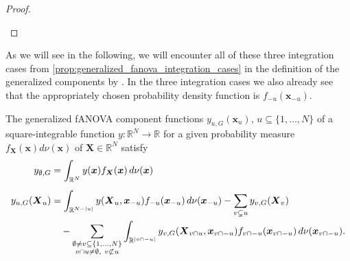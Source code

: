 \begin{proof}
\begin{center}
\end{center}
\end{proof}
As we will see in the following, we will encounter all of these three integration cases from \autoref{prop:generalized_fanova_integration_cases} in the definition of the generalized components by \cite{rahman2014}.
In the three integration cases we also already see that the appropriately chosen probability density function is $f_{-u}(\boldsymbol{x}_{-u})$.
\newpage
\begin{proposition}\label{prop:generalized_fanova_components_rahman}
The generalized fANOVA component functions \( y_{u,G}(\boldsymbol{x}_u)\), \(u \subseteq \{1,\dots,N\}\) of a square-integrable function $y:\mathbb{R}^N \to \mathbb{R}$ for a given probability measure $f_{\boldsymbol{X}}(\boldsymbol{x}) d\nu(\boldsymbol{x})$ of $\boldsymbol{X} \in \mathbb{R}^N$ satisfy
\begin{align}
y_{\emptyset,G} &= \int_{\mathbb{R}^N} y(\boldsymbol{x}) f_{\boldsymbol{X}}(\boldsymbol{x}) \, d \nu(\boldsymbol{x}) \\[0.5em]
y_{u,G}(\boldsymbol{X}_u) &= \int_{\mathbb{R}^{N - |u|}} y(\boldsymbol{X}_u, \boldsymbol{x}_{-u}) f_{-u}(\boldsymbol{x}_{-u}) \, d \nu(\boldsymbol{x}_{-u})
- \sum_{v \subsetneq u} y_{v,G}(\boldsymbol{X}_v) \notag \\
&\quad - \sum_{\substack{\emptyset \ne v \subseteq \{1,\dots,N\} \\ v \cap u \ne \emptyset,\ v \not\subset u}} 
\int_{\mathbb{R}^{|v \cap -u|}} y_{v,G}(\boldsymbol{X}_{v \cap u}, \boldsymbol{x}_{v \cap -u}) f_{v \cap -u}(\boldsymbol{x}_{v \cap -u}) \, d \nu(\boldsymbol{x}_{v \cap -u}).
\end{align}
\end{proposition}
